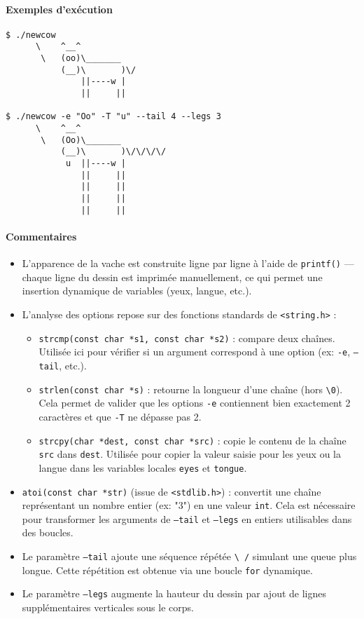 \documentclass[a4paper,french,11pt]{article}
\begin{document}
\paragraph{Exemples d’exécution}

\begin{verbatim}
$ ./newcow
      \    ^__^
       \   (oo)\_______
           (__)\       )\/
               ||----w |
               ||     ||

$ ./newcow -e "Oo" -T "u" --tail 4 --legs 3
      \    ^__^
       \   (Oo)\_______
           (__)\       )\/\/\/\/
            u  ||----w |
               ||     ||
               ||     ||
               ||     ||
               ||     ||
\end{verbatim}

\paragraph{Commentaires}
\begin{itemize}
  \item L’apparence de la vache est construite ligne par ligne à l’aide de \texttt{printf()} — chaque ligne du dessin est imprimée manuellement, ce qui permet une insertion dynamique de variables (yeux, langue, etc.).

  \item L’analyse des options repose sur des fonctions standards de \texttt{<string.h>} :
  \begin{itemize}
    \item \texttt{strcmp(const char *s1, const char *s2)} : compare deux chaînes. Utilisée ici pour vérifier si un argument correspond à une option (ex: \texttt{-e}, \texttt{--tail}, etc.).
    \item \texttt{strlen(const char *s)} : retourne la longueur d'une chaîne (hors \texttt{\textbackslash 0}). Cela permet de valider que les options \texttt{-e} contiennent bien exactement 2 caractères et que \texttt{-T} ne dépasse pas 2.
    \item \texttt{strcpy(char *dest, const char *src)} : copie le contenu de la chaîne \texttt{src} dans \texttt{dest}. Utilisée pour copier la valeur saisie pour les yeux ou la langue dans les variables locales \texttt{eyes} et \texttt{tongue}.
  \end{itemize}

  \item \texttt{atoi(const char *str)} (issue de \texttt{<stdlib.h>}) : convertit une chaîne représentant un nombre entier (ex: "3") en une valeur \texttt{int}. Cela est nécessaire pour transformer les arguments de \texttt{--tail} et \texttt{--legs} en entiers utilisables dans des boucles.

  \item Le paramètre \texttt{--tail} ajoute une séquence répétée \verb|\ /| simulant une queue plus longue. Cette répétition est obtenue via une boucle \texttt{for} dynamique.

  \item Le paramètre \texttt{--legs} augmente la hauteur du dessin par ajout de lignes supplémentaires verticales sous le corps.
\end{itemize}
\end{document}
